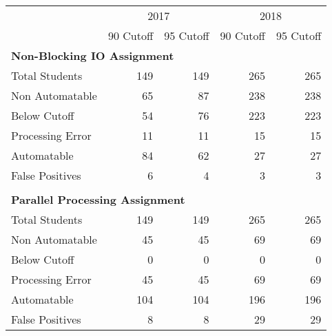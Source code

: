 \begin{tabular}{lrrrr} \toprule
& \multicolumn{2}{c}{2017} & \multicolumn{2}{c}{2018} \\
& 90 Cutoff & 95 Cutoff & 90 Cutoff & 95 Cutoff \\
\midrule
\multicolumn{5}{l}{ \textbf{Non-Blocking IO Assignment} }\\
\tspace Total Students           &   149 &   149 &   265 &   265 \\
\tspace Non Automatable          &    65 &    87 &   238 &   238 \\
\tspace \tspace Below Cutoff     &    54 &    76 &   223 &   223 \\
\tspace \tspace Processing Error &    11 &    11 &    15 &    15 \\
\tspace Automatable              &    84 &    62 &    27 &    27 \\
\tspace \tspace False Positives  &     6 &     4 &     3 &     3 \\
\\
\multicolumn{5}{l}{ \textbf{Parallel Processing Assignment} }\\
\tspace Total Students           &   149 &   149 &   265 &   265 \\
\tspace Non Automatable          &    45 &    45 &    69 &    69 \\
\tspace \tspace Below Cutoff     &     0 &     0 &     0 &     0 \\
\tspace \tspace Processing Error &    45 &    45 &    69 &    69 \\
\tspace Automatable              &   104 &   104 &   196 &   196 \\
\tspace \tspace False Positives  &     8 &     8 &    29 &    29 \\
\bottomrule
\end{tabular}
